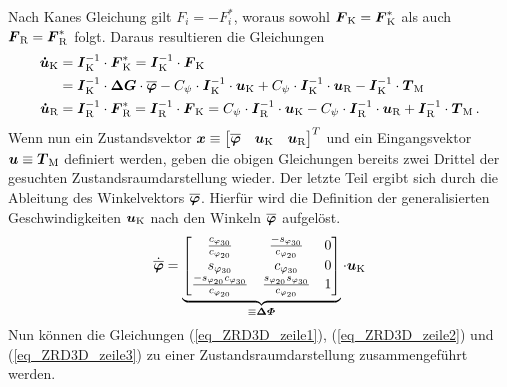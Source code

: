 Nach Kanes Gleichung gilt $F_i=-F^*_i$, woraus sowohl $\boldsymbol{F}_{\text{K}}=\boldsymbol{F}^*_{\text{K}}$ als auch $\boldsymbol{F}_{\text{R}}=\boldsymbol{F}^*_{\text{R}}$ folgt. Daraus resultieren die Gleichungen
\begin{align}
\label{eq_ZRD3D_zeile2}
\boldsymbol{\dot{u}}_{\text{K}} &= \boldsymbol{I}^{-1}_{\text{K}} \cdot \boldsymbol{F}^*_{\text{K}} = \boldsymbol{I}^{-1}_{\text{K}} \cdot \boldsymbol{F}_{\text{K}} 
\\
&= \boldsymbol{I}^{-1}_{\text{K}} \cdot \boldsymbol{\Delta G} \cdot \boldsymbol{\overline{\varphi}} - C_{\psi}\cdot \boldsymbol{I}^{-1}_{\text{K}} \cdot \boldsymbol{u}_{\text{K}} + C_{\psi}\cdot \boldsymbol{I}^{-1}_{\text{K}} \cdot \boldsymbol{u}_{\text{R}} - \boldsymbol{I}^{-1}_{\text{K}} \cdot \boldsymbol{T}_{\text{M}} \nonumber
\\
\label{eq_ZRD3D_zeile3}
\boldsymbol{\dot{u}}_{\text{R}} &= \boldsymbol{I}^{-1}_{\text{R}} \cdot \boldsymbol{F}^*_{\text{R}} = \boldsymbol{I}^{-1}_{\text{R}} \cdot \boldsymbol{F}_{\text{K}} =
 C_{\psi}\cdot \boldsymbol{I}^{-1}_{\text{R}} \cdot \boldsymbol{u}_{\text{K}} - C_{\psi}\cdot \boldsymbol{I}^{-1}_{\text{R}} \cdot \boldsymbol{u}_{\text{R}} + \boldsymbol{I}^{-1}_{\text{R}} \cdot \boldsymbol{T}_{\text{M}} \,.
\end{align}
Wenn nun ein Zustandsvektor $\boldsymbol{x} \equiv \begin{bmatrix} \boldsymbol{\overline{\varphi}} & \boldsymbol{u}_{\text{K}} & \boldsymbol{u}_{\text{R}}\end{bmatrix}^T$ und ein Eingangsvektor $\boldsymbol{u} \equiv \boldsymbol{T}_{\text{M}}$ definiert werden, geben die obigen Gleichungen bereits zwei Drittel der gesuchten Zustandsraumdarstellung wieder. Der letzte Teil ergibt sich durch die Ableitung des Winkelvektors $\boldsymbol{\overline{\varphi}}$. Hierfür wird die Definition der generalisierten Geschwindigkeiten $\boldsymbol{u}_{\text{K}}$ nach den Winkeln $\boldsymbol{\overline{\varphi}}$ aufgelöst.
\begin{equation}
\label{eq_ZRD3D_zeile1}
\dot{\boldsymbol{\overline{\varphi}}} = \underbrace{\begin{bmatrix}
\frac{c_{\varphi_{\text{30}}}}{c_{\varphi_{\text{20}}}} & \frac{-s_{\varphi_{\text{30}}}}{c_{\varphi_{\text{20}}}} & 0 
\\
s_{\varphi_{\text{30}}} & c_{\varphi_{\text{30}}} & 0 
\\
\frac{-s_{\varphi_{\text{20}}}c_{\varphi_{\text{30}}}}{c_{\varphi_{\text{20}}}} &
\frac{s_{\varphi_{\text{20}}}s_{\varphi_{\text{30}}}}{c_{\varphi_{\text{20}}}} & 1
\end{bmatrix}}_{\equiv \boldsymbol{\Delta\varPhi}}\cdot \boldsymbol{u}_{\text{K}}
\end{equation}
Nun können die Gleichungen (\ref{eq_ZRD3D_zeile1}), (\ref{eq_ZRD3D_zeile2}) und (\ref{eq_ZRD3D_zeile3}) zu einer Zustandsraumdarstellung zusammengeführt werden.
